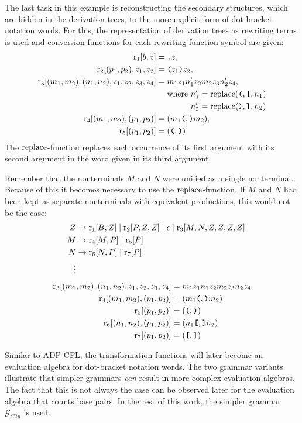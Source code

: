 \documentclass[
    a4paper,
    12pt,
    twoside,
    BCOR=12mm,
    parskip=half,
    chapterprefix,
    numbers=noenddot,
    bibliography=totoc
]{scrbook}
\begin{document}
\begin{example}
	The last task in this example is reconstructing the secondary structures, which are hidden in the derivation trees, to the more explicit form of dot-bracket notation words. For this, the representation of derivation trees as rewriting terms is used and conversion functions for each rewriting function symbol are given:
	\begin{align*}
		\op{r}_1[b,z] &= \ts{.}z,\\
		\op{r}_2[(p_1,p_2),z_1,z_2] &= \ts{(} z_1 \ts{)} z_2,\\
		\op{r}_3[(m_1,m_2),(n_1,n_2),z_1,z_2,z_3,z_4] &= m_1 z_1 n'_1 z_2 m_2 z_3 n'_2 z_4,\\
		&\mathrel{\phantom{=}}\text{where } n'_1 = \op{replace}(\ts{(},\ts{[},n_1)\\
		&\mathrel{\phantom{=}}\phantom{\text{where }} n'_2 = \op{replace}(\ts{)},\ts{]},n_2)\\
		\op{r}_4[(m_1,m_2),(p_1,p_2)] &= (m_1 \ts{(},\ts{)} m_2),\\
		\op{r}_5[(p_1,p_2)] &= (\ts{(},\ts{)})
	\end{align*}
	The $\mathrm{replace}$-function replaces each occurrence of its first argument with its second argument in the word given in its third argument.
  
  Remember that the nonterminals $M$ and $N$ were unified as a single nonterminal. Because of this it becomes necessary to use the $\mathrm{replace}$-function. If $M$ and $N$ had been kept as separate nonterminals with equivalent productions, this would not be the case:
	\begin{align*}
		&&Z &\to \mathrm{r}_1[B,Z] \mid \mathrm{r}_2[P,Z,Z] \mid \epsilon \mid \mathrm{r}_3[M,N,Z,Z,Z,Z]\\
		&&M &\to \mathrm{r}_4[M,P] \mid \mathrm{r}_5[P]\\
    &&N &\to \mathrm{r}_6[N,P] \mid \mathrm{r}_7[P]\\
    &&\vdots
	\end{align*}
	\begin{align*}
		\op{r}_3[(m_1,m_2),(n_1,n_2),z_1,z_2,z_3,z_4] &= m_1 z_1 n_1 z_2 m_2 z_3 n_2 z_4\\
		\op{r}_4[(m_1,m_2),(p_1,p_2)] &= (m_1 \ts{(},\ts{)} m_2)\\
		\op{r}_5[(p_1,p_2)] &= (\ts{(},\ts{)})\\
		\op{r}_6[(n_1,n_2),(p_1,p_2)] &= (n_1 \ts{[},\ts{]} n_2)\\
		\op{r}_7[(p_1,p_2)] &= (\ts{[},\ts{]})
	\end{align*}
  
  Similar to ADP-CFL, the transformation functions will later become an evaluation algebra for dot-bracket notation words. The two grammar variants illustrate that simpler grammars \emph{can} result in more complex evaluation algebras. The fact that this is not always the case can be observed later for the evaluation algebra that counts base pairs. In the rest of this work, the simpler grammar $\mathcal{G}_{C2u}$ is used.
\end{example}
\end{document}
